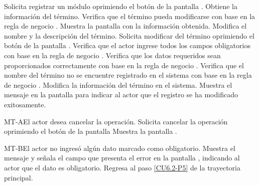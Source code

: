 	\begin{UCtrayectoria}
		\UCpaso[\UCactor] Solicita registrar un módulo oprimiendo el botón \editar de la pantalla .
		\UCpaso[\UCsist] Obtiene la información del término.
		\UCpaso[\UCsist] Verifica que el término pueda modificarse con base en la regla de negocio . 
		\UCpaso[\UCsist] Muestra la pantalla  con la información obtenida.
		\UCpaso[\UCactor] Modifica el nombre y la descripción del término. \label{CU6.2-P5}
		\UCpaso[\UCactor] Solicita modificar del término oprimiendo el botón  de la pantalla . 
		\UCpaso[\UCsist] Verifica que el actor ingrese todos los campos obligatorios con base en la regla de negocio . 
		\UCpaso[\UCsist] Verifica que los datos requeridos sean proporcionados correctamente con base en la regla de negocio .  
		\UCpaso[\UCsist] Verifica que el nombre del término no se encuentre registrado en el sistema con base en la regla de negocio . 
		\UCpaso[\UCsist] Modifica la información del término en el sistema.
		\UCpaso[\UCsist] Muestra el mensaje  en la pantalla  para indicar al actor que el registro se ha modificado exitosamente.
	\end{UCtrayectoria}		
	
	\begin{UCtrayectoriaA}{MT-A}{El actor desea cancelar la operación.}
		\UCpaso[\UCactor] Solicita cancelar la operación oprimiendo el botón  de la pantalla 
		\UCpaso[\UCsist] Muestra la pantalla .
	\end{UCtrayectoriaA}

	\begin{UCtrayectoriaA}{MT-B}{El actor no ingresó algún dato marcado como obligatorio.}
		\UCpaso[\UCsist] Muestra el mensaje  y señala el campo que presenta el error en la pantalla , indicando al actor que el dato es obligatorio.
		\UCpaso Regresa al paso \ref{CU6.2-P5} de la trayectoria principal.
	\end{UCtrayectoriaA}

